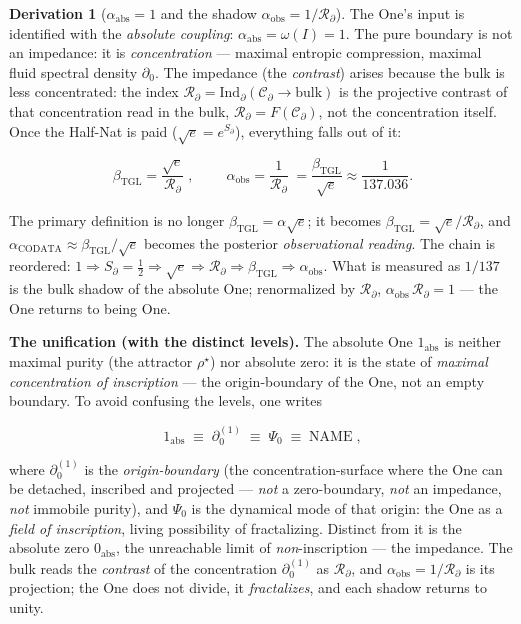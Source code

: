 \documentclass[11pt]{article}
\newcommand{\bTGL}{\beta_{\mathrm{TGL}}}\newcommand{\Msun}{M_{\odot}}\newcommand{\TGL}{\mathrm{TGL}}
\theoremstyle{definition}\newtheorem{deriv}{Derivation}
\begin{document}
\begin{deriv}[$\alpha_{\mathrm{abs}}=1$ and the shadow $\alpha_{\mathrm{obs}}=1/\mathcal{R}_\partial$]

The One's input is identified with the \emph{absolute coupling}: $\alpha_{\mathrm{abs}}=\omega(I)=1$. The pure boundary is not an impedance: it is \emph{concentration} --- maximal entropic compression, maximal fluid spectral density $\partial_0$. The impedance (the \emph{contrast}) arises because the bulk is less concentrated: the index $\mathcal{R}_\partial=\mathrm{Ind}_\partial(\mathcal{C}_\partial\to\mathrm{bulk})$ is the projective contrast of that concentration read in the bulk, $\mathcal{R}_\partial=F(\mathcal{C}_\partial)$, not the concentration itself. Once the Half-Nat is paid ($\sqrt{e}=e^{S_\partial}$), everything falls out of it:

\begin{equation}\boxed{\;\bTGL=\frac{\sqrt{e}}{\mathcal{R}_\partial}\;},\qquad \boxed{\;\alpha_{\mathrm{obs}}=\frac{1}{\mathcal{R}_\partial}\;}=\frac{\bTGL}{\sqrt{e}}\approx\frac{1}{137.036}.\end{equation}

The primary definition is no longer $\bTGL=\alpha\sqrt{e}$; it becomes $\bTGL=\sqrt{e}/\mathcal{R}_\partial$, and $\alpha_{\mathrm{CODATA}}\approx\bTGL/\sqrt{e}$ becomes the posterior \emph{observational reading}. The chain is reordered: $1\Rightarrow S_\partial=\tfrac12\Rightarrow\sqrt{e}\Rightarrow\mathcal{R}_\partial\Rightarrow\bTGL\Rightarrow\alpha_{\mathrm{obs}}$. What is measured as $1/137$ is the bulk shadow of the absolute One; renormalized by $\mathcal{R}_\partial$, $\alpha_{\mathrm{obs}}\,\mathcal{R}_\partial=1$ --- the One returns to being One.

\textbf{The unification (with the distinct levels).} The absolute One $1_{\mathrm{abs}}$ is neither maximal purity (the attractor $\rho^\star$) nor absolute zero: it is the state of \emph{maximal concentration of inscription} --- the origin-boundary of the One, not an empty boundary. To avoid confusing the levels, one writes

\begin{equation}\boxed{\;1_{\mathrm{abs}}\;\equiv\;\partial_0^{(1)}\;\equiv\;\Psi_0\;\equiv\;\mathrm{NAME}\;},\end{equation}

where $\partial_0^{(1)}$ is the \emph{origin-boundary} (the concentration-surface where the One can be detached, inscribed and projected --- \emph{not} a zero-boundary, \emph{not} an impedance, \emph{not} immobile purity), and $\Psi_0$ is the dynamical mode of that origin: the One as a \emph{field of inscription}, living possibility of fractalizing. Distinct from it is the absolute zero $0_{\mathrm{abs}}$, the unreachable limit of \emph{non}-inscription --- the impedance. The bulk reads the \emph{contrast} of the concentration $\partial_0^{(1)}$ as $\mathcal{R}_\partial$, and $\alpha_{\mathrm{obs}}=1/\mathcal{R}_\partial$ is its projection; the One does not divide, it \emph{fractalizes}, and each shadow returns to unity.


\end{deriv}
\end{document}
